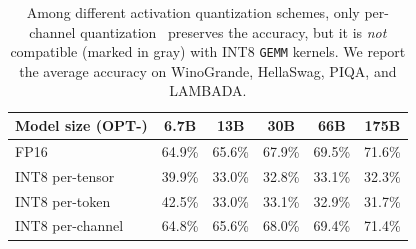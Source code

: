 \newcommand{\textgray}[1]{\textcolor{mylightgray}{{#1}}}
\begin{table}[t]
    \setlength{\tabcolsep}{3pt}
    \small
    \centering
    \caption{Among different activation quantization schemes, only per-channel quantization~\cite{bondarenko2021understanding} preserves the accuracy, but it is \emph{not} compatible (marked in \textgray{gray}) with INT8 \texttt{GEMM} kernels. 
    We report the average accuracy on WinoGrande, HellaSwag, PIQA, and LAMBADA.
    }
    \label{tab:per-feature}
    \begin{tabular}{lccccc}
        \toprule
        Model size (OPT-)                  & {6.7B}            & {13B}             & {30B}             & {66B}             & {175B}            \\
        \midrule
        FP16                        & 64.9\%            & 65.6\%            & 67.9\%            & 69.5\%            & 71.6\%            \\
        \midrule
        INT8 per-tensor             & 39.9\%            & 33.0\%            & 32.8\%            & 33.1\%            & 32.3\%            \\
        INT8 per-token              & 42.5\%            & 33.0\%            & 33.1\%            & 32.9\%            & 31.7\%            \\
        \textgray{INT8 per-channel} & \textgray{64.8\%} & \textgray{65.6\%} & \textgray{68.0\%} & \textgray{69.4\%} & \textgray{71.4\%} \\
        \bottomrule
    \end{tabular}
\end{table}
